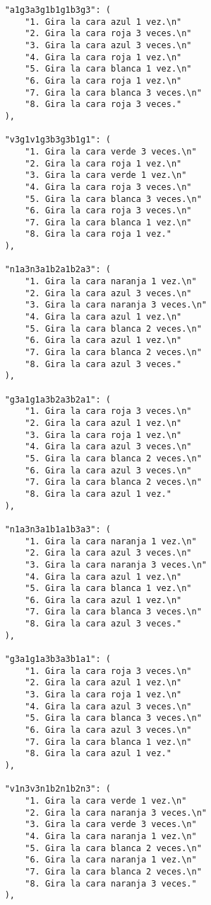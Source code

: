 \begin{lstlisting}
    "a1g3a3g1b1g1b3g3": (
        "1. Gira la cara azul 1 vez.\n"
        "2. Gira la cara roja 3 veces.\n"
        "3. Gira la cara azul 3 veces.\n"
        "4. Gira la cara roja 1 vez.\n"
        "5. Gira la cara blanca 1 vez.\n"
        "6. Gira la cara roja 1 vez.\n"
        "7. Gira la cara blanca 3 veces.\n"
        "8. Gira la cara roja 3 veces."
    ),
    
    "v3g1v1g3b3g3b1g1": (
        "1. Gira la cara verde 3 veces.\n"
        "2. Gira la cara roja 1 vez.\n"
        "3. Gira la cara verde 1 vez.\n"
        "4. Gira la cara roja 3 veces.\n"
        "5. Gira la cara blanca 3 veces.\n"
        "6. Gira la cara roja 3 veces.\n"
        "7. Gira la cara blanca 1 vez.\n"
        "8. Gira la cara roja 1 vez."
    ),
    
    "n1a3n3a1b2a1b2a3": (
        "1. Gira la cara naranja 1 vez.\n"
        "2. Gira la cara azul 3 veces.\n"
        "3. Gira la cara naranja 3 veces.\n"
        "4. Gira la cara azul 1 vez.\n"
        "5. Gira la cara blanca 2 veces.\n"
        "6. Gira la cara azul 1 vez.\n"
        "7. Gira la cara blanca 2 veces.\n"
        "8. Gira la cara azul 3 veces."
    ),
    
    "g3a1g1a3b2a3b2a1": (
        "1. Gira la cara roja 3 veces.\n"
        "2. Gira la cara azul 1 vez.\n"
        "3. Gira la cara roja 1 vez.\n"
        "4. Gira la cara azul 3 veces.\n"
        "5. Gira la cara blanca 2 veces.\n"
        "6. Gira la cara azul 3 veces.\n"
        "7. Gira la cara blanca 2 veces.\n"
        "8. Gira la cara azul 1 vez."
    ),
    
    "n1a3n3a1b1a1b3a3": (
        "1. Gira la cara naranja 1 vez.\n"
        "2. Gira la cara azul 3 veces.\n"
        "3. Gira la cara naranja 3 veces.\n"
        "4. Gira la cara azul 1 vez.\n"
        "5. Gira la cara blanca 1 vez.\n"
        "6. Gira la cara azul 1 vez.\n"
        "7. Gira la cara blanca 3 veces.\n"
        "8. Gira la cara azul 3 veces."
    ),
    
    "g3a1g1a3b3a3b1a1": (
        "1. Gira la cara roja 3 veces.\n"
        "2. Gira la cara azul 1 vez.\n"
        "3. Gira la cara roja 1 vez.\n"
        "4. Gira la cara azul 3 veces.\n"
        "5. Gira la cara blanca 3 veces.\n"
        "6. Gira la cara azul 3 veces.\n"
        "7. Gira la cara blanca 1 vez.\n"
        "8. Gira la cara azul 1 vez."
    ),
    
    "v1n3v3n1b2n1b2n3": (
        "1. Gira la cara verde 1 vez.\n"
        "2. Gira la cara naranja 3 veces.\n"
        "3. Gira la cara verde 3 veces.\n"
        "4. Gira la cara naranja 1 vez.\n"
        "5. Gira la cara blanca 2 veces.\n"
        "6. Gira la cara naranja 1 vez.\n"
        "7. Gira la cara blanca 2 veces.\n"
        "8. Gira la cara naranja 3 veces."
    ),
    

\end{lstlisting}
